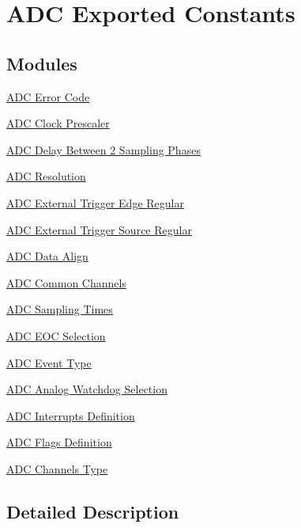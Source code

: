 \hypertarget{group___a_d_c___exported___constants}{}\section{A\+DC Exported Constants}
\label{group___a_d_c___exported___constants}
\subsection*{Modules}
\begin{DoxyCompactItemize}
\item 
\hyperlink{group___a_d_c___error___code}{A\+D\+C Error Code}
\item 
\hyperlink{group___a_d_c___clock_prescaler}{A\+D\+C Clock Prescaler}
\item 
\hyperlink{group___a_d_c__delay__between__2__sampling__phases}{A\+D\+C Delay Between 2 Sampling Phases}
\item 
\hyperlink{group___a_d_c___resolution}{A\+D\+C Resolution}
\item 
\hyperlink{group___a_d_c___external__trigger__edge___regular}{A\+D\+C External Trigger Edge Regular}
\item 
\hyperlink{group___a_d_c___external__trigger___source___regular}{A\+D\+C External Trigger Source Regular}
\item 
\hyperlink{group___a_d_c__data__align}{A\+D\+C Data Align}
\item 
\hyperlink{group___a_d_c__channels}{A\+D\+C Common Channels}
\item 
\hyperlink{group___a_d_c__sampling__times}{A\+D\+C Sampling Times}
\item 
\hyperlink{group___a_d_c___e_o_c_selection}{A\+D\+C E\+O\+C Selection}
\item 
\hyperlink{group___a_d_c___event__type}{A\+D\+C Event Type}
\item 
\hyperlink{group___a_d_c__analog__watchdog__selection}{A\+D\+C Analog Watchdog Selection}
\item 
\hyperlink{group___a_d_c__interrupts__definition}{A\+D\+C Interrupts Definition}
\item 
\hyperlink{group___a_d_c__flags__definition}{A\+D\+C Flags Definition}
\item 
\hyperlink{group___a_d_c__channels__type}{A\+D\+C Channels Type}
\end{DoxyCompactItemize}


\subsection{Detailed Description}
